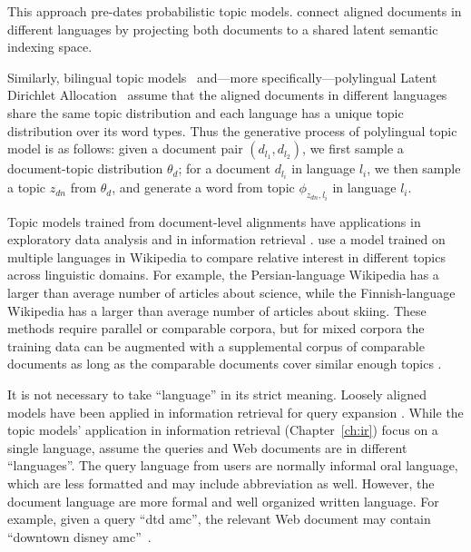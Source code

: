 This approach pre-dates probabilistic topic models.
\citet{Landauer-1990} connect aligned documents in different languages
by projecting both documents to a shared latent semantic indexing
space.

Similarly, bilingual topic models~\citep{zhao-06,DeSmet-09} and---more
specifically---polylingual Latent Dirichlet Allocation~\citep[\plda]{mimno-09}
assume that the aligned documents in different languages share the
same topic distribution and each language has a unique topic
distribution over its word types.
Thus the generative process of polylingual topic model is as follows:
given a document pair $(d_{l_1}, d_{l_2})$, we first sample a
document-topic distribution $\theta_d$; for a document $d_{l_i}$ in
language $l_i$, we then sample a topic $z_{dn}$ from $\theta_d$, and
generate a word from topic $\phi_{z_{dn}, l_i}$ in language $l_i$.

Topic models trained from document-level alignments have applications in exploratory data analysis and in information retrieval \citep{vulic2013cross}.
\citet{mimno-09} use a model trained on multiple languages in Wikipedia to compare relative interest in different topics across linguistic domains.
For example, the Persian-language Wikipedia has a larger than average number of articles about science, while the Finnish-language Wikipedia has a larger than average number of articles about skiing.
These methods require parallel or comparable corpora, but for mixed corpora the training data can be augmented with a supplemental corpus of comparable documents as long as  the comparable documents cover similar enough topics \citep{mimno-12b}.

It is not necessary to take ``language'' in its strict meaning.
Loosely aligned models have been applied in information retrieval for query expansion \citep{Gao-2011,Gao-2012}. 
While the topic models' application in information retrieval (Chapter~\ref{ch:ir}) focus
on a single language, \cite{Gao-2011} assume the queries and Web documents are in
different ``languages''. The query language from users are normally informal oral language, 
which are less formatted and may include abbreviation as well. However, the document language
are more formal and well organized written language. For example, given a query ``dtd amc'',
the relevant Web document may contain ``downtown disney amc''~\citep{Jiang-2016}. 

